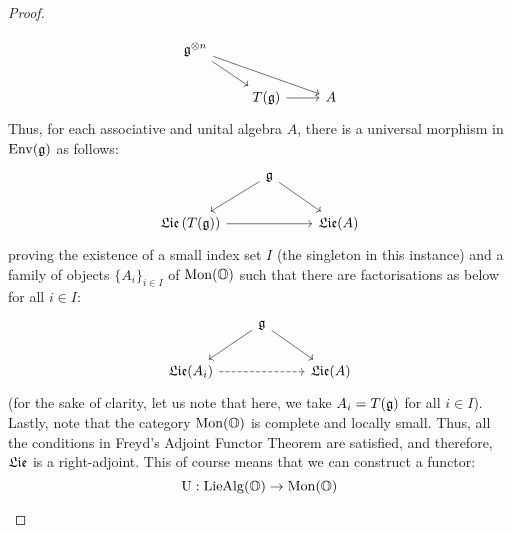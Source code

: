 \begin{proof}
\begin{enumerate}
                                $$
                                    \begin{tikzcd}
                                    	{\g^{\tensor n}} \\
                                    	& {T(\g)} & {A}
                                    	\arrow[from=1-1, to=2-2]
                                    	\arrow[from=2-2, to=2-3]
                                    	\arrow[from=1-1, to=2-3]
                                    \end{tikzcd}
                                $$
                            Thus, for each associative and unital algebra $A$, there is a universal morphism in $\mathrm{Env}(\mathfrak{g})$ as follows:
                                $$
                                    \begin{tikzcd}
                                    	& {\g} \\
                                    	{\frakLie\left(T(\g)\right)} && {\frakLie(A)}
                                    	\arrow[from=2-1, to=2-3]
                                    	\arrow[from=1-2, to=2-1]
                                    	\arrow[from=1-2, to=2-3]
                                    \end{tikzcd}
                                $$
                            proving the existence of a small index set $I$ (the singleton in this instance) and a family of objects $\{A_i\}_{i \in I}$ of $\mathrm{Mon}(\mathbb{O})$ such that there are factorisations as below for all $i \in I$:
                                $$
                                    \begin{tikzcd}
                                    	& {\g} \\
                                    	{\frakLie(A_i)} && {\frakLie(A)}
                                    	\arrow[from=2-1, to=2-3, dashed]
                                    	\arrow["{}"', from=1-2, to=2-1]
                                    	\arrow["{}", from=1-2, to=2-3]
                                    \end{tikzcd}
                                $$
                            (for the sake of clarity, let us note that here, we take $A_i = T(\mathfrak{g})$ for all $i \in I$). Lastly, note that the category $\mathrm{Mon}(\mathbb{O})$ is complete and locally small. Thus, all the conditions in Freyd's Adjoint Functor Theorem are satisfied, and therefore, $\mathfrak{Lie}$ is a right-adjoint. This of course means that we can construct a functor:
                                $$\mathrm{U}: \mathrm{Lie}\mathrm{Alg}(\mathbb{O}) \to \mathrm{Mon}(\mathbb{O})$$

\end{enumerate}
\end{proof}
